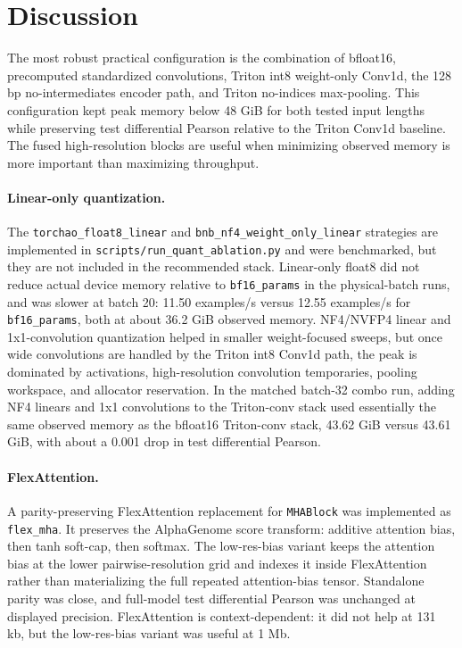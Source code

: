 \documentclass[11pt]{article}
\begin{document}
\section{Discussion}

The most robust practical configuration is the combination of bfloat16,
precomputed standardized convolutions, Triton int8 weight-only Conv1d, the
128 bp no-intermediates encoder path, and Triton no-indices max-pooling. This
configuration kept peak memory below 48 GiB for both tested input lengths while
preserving test differential Pearson relative to the Triton Conv1d baseline. The
fused high-resolution blocks are useful when minimizing observed memory is more
important than maximizing throughput.

\paragraph{Linear-only quantization.}
The \texttt{torchao\_float8\_linear} and
\texttt{bnb\_nf4\_weight\_only\_linear} strategies are implemented in
\texttt{scripts/run\_quant\_ablation.py} and were benchmarked, but they are not
included in the recommended stack. Linear-only float8 did not reduce actual
device memory relative to \texttt{bf16\_params} in the physical-batch runs, and
was slower at batch 20: 11.50 examples/s versus 12.55 examples/s for
\texttt{bf16\_params}, both at about 36.2 GiB observed memory. NF4/NVFP4 linear
and 1x1-convolution quantization helped in smaller weight-focused sweeps, but
once wide convolutions are handled by the Triton int8 Conv1d path, the peak is
dominated by activations, high-resolution convolution temporaries, pooling
workspace, and allocator reservation. In the matched batch-32 combo run, adding
NF4 linears and 1x1 convolutions to the Triton-conv stack used essentially the
same observed memory as the bfloat16 Triton-conv stack, 43.62 GiB versus
43.61 GiB, with about a 0.001 drop in test differential Pearson.

\paragraph{FlexAttention.}
A parity-preserving FlexAttention replacement for \texttt{MHABlock} was
implemented as \texttt{flex\_mha}. It preserves the AlphaGenome score transform:
additive attention bias, then tanh soft-cap, then softmax. The low-res-bias
variant keeps the attention bias at the lower pairwise-resolution grid and
indexes it inside FlexAttention rather than materializing the full repeated
attention-bias tensor. Standalone parity was close, and full-model test
differential Pearson was unchanged at displayed precision. FlexAttention is
context-dependent: it did not help at 131 kb, but the low-res-bias variant was
useful at 1 Mb.
\end{document}
